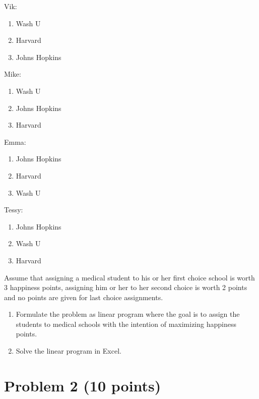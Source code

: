 \documentclass{article}[11 pt]    %
\begin{document}
\noindent Vik:
\begin{enumerate}
\item Wash U
\item Harvard
\item Johns Hopkins
\end{enumerate}
\newpage
\noindent Mike:
\begin{enumerate}
\item Wash U
\item Johns Hopkins
\item Harvard
\end{enumerate}
Emma:
\begin{enumerate}
\item Johns Hopkins
\item Harvard
\item Wash U
\end{enumerate}
\noindent Tessy:
\begin{enumerate}
\item Johns Hopkins
\item Wash U
\item Harvard
\end{enumerate}

Assume that assigning a medical student to his or her first choice school is worth 3 happiness points, assigning him or her to her second choice is worth 2 points and no points are given for last choice assignments.  

\begin{enumerate}
\item Formulate the problem as linear program where the goal is to assign the students to medical schools with the intention of maximizing happiness points.
\item Solve the linear program in Excel.
\end{enumerate}


\section*{Problem 2 (10 points)}
\end{document}
